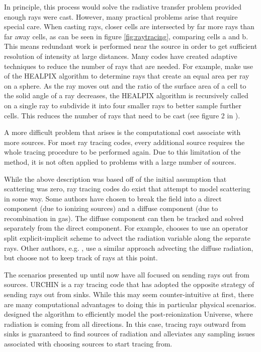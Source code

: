 In principle, this process would solve the radiative transfer problem provided enough rays were cast. However, many practical problems arise that require special care. When casting rays, closer cells are intersected by far more rays than far away cells, as can be seen in figure \ref{fig:raytracing}, comparing cells a and b. This means redundant work is performed near the source in order to get sufficient resolution of intensity at large distances. Many codes have created adaptive techniques to reduce the number of rays that are needed. For example, \citet{abelWandelt02} make use of the HEALPIX algorithm \citep{gorskiEt05} to determine rays that create an equal area per ray on a sphere. As the ray moves out and the ratio of the surface area of a cell to the solid angle of a ray decreases, the HEALPIX algorithm is recursively called on a single ray to subdivide it into four smaller rays to better sample further cells. This reduces the number of rays that need to be cast (see figure 2 in \citet{abelWandelt02}).

A more difficult problem that arises is the computational cost associate with more sources. For most ray tracing codes, every additional source requires the whole tracing procedure to be performed again. Due to this limitation of the method, it is not often applied to problems with a large number of sources.

While the above description was based off of the initial assumption that scattering was zero, ray tracing codes do exist that attempt to model scattering in some way. Some authors have chosen to break the field into a direct component (due to ionizing sources) and a diffuse component (due to recombination in gas). The diffuse component can then be tracked and solved separately from the direct component. For example, \citet{razoumovScott99} chooses to use an operator split explicit-implicit scheme to advect the radiation variable along the separate rays. Other authors, e.g. \citet{abelNormanMadau99}, use a similar approach advecting the diffuse radiation, but choose not to keep track of rays at this point.

The scenarios presented up until now have all focused on sending rays out from sources. URCHIN \citep{altayTheuns13} is a ray tracing code that has adopted the opposite strategy of sending rays out from sinks. While this may seem counter-intuitive at first, there are many computational advantages to doing this in particular physical scenarios. \citet{altayTheuns13} designed the algorithm to efficiently model the post-reionization Universe, where radiation is coming from all directions. In this case, tracing rays outward from sinks is guaranteed to find sources of radiation and alleviates any sampling issues associated with choosing sources to start tracing from.

